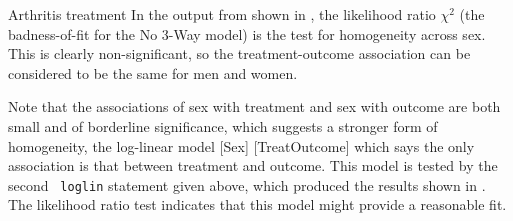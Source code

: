 \begin{Example}[arthrit4]{Arthritis treatment}
In the output from 
shown in , the likelihood ratio \(\chi^2\) (the
badness-of-fit for the No 3-Way model) is the test for homogeneity
across sex.  This is clearly non-significant, so the
treatment-outcome association can be considered to be the same for
men and women.

\begin{Output}[htb]
\caption{Arthritis treatment data, testing homogeneity}\label{out:arthfreq.7}
\small

\end{Output}

Note that the associations of sex with treatment and sex with outcome
are both small and of borderline significance, which suggests a
stronger form of homogeneity, the log-linear model [Sex]
[TreatOutcome] which says the only association is that between
treatment and outcome.  This model is tested by the second {\tt
loglin} statement given above, which produced the results shown
in .
The likelihood ratio test indicates that this model might provide a
reasonable fit.
\begin{Output}[htb]
\caption{Arthritis treatment data, testing homogeneity}\label{out:arthfreq.8}
\small

\end{Output}
\end{Example}
